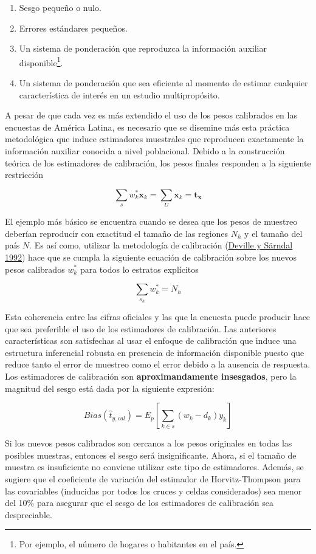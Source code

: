 \documentclass[
  12pt,
  spanish,
]{book}
\providecommand{\tightlist}{%
  \setlength{\itemsep}{0pt}\setlength{\parskip}{0pt}}
\begin{document}
\begin{enumerate}
\def\labelenumi{\arabic{enumi}.}
\tightlist
\item
  Sesgo pequeño o nulo.
\item
  Errores estándares pequeños.
\item
  Un sistema de ponderación que reproduzca la información auxiliar disponible\footnote{Por ejemplo, el número de hogares o habitantes en el país.}.
\item
  Un sistema de ponderación que sea eficiente al momento de estimar cualquier característica de interés en un estudio multipropósito.
\end{enumerate}

A pesar de que cada vez es más extendido el uso de los pesos calibrados en las encuestas de América Latina, es necesario que se disemine más esta práctica metodológica que induce estimadores muestrales que reproducen exactamente la información auxiliar conocida a nivel poblacional. Debido a la construcción teórica de los estimadores de calibración, los pesos finales responden a la siguiente restricción

\[
\sum_{s}w^*_{k}\boldsymbol{x}_k = \sum_{U}\boldsymbol{x}_{k} = \boldsymbol{t}_{\boldsymbol{x}}
\]

El ejemplo más básico se encuentra cuando se desea que los pesos de muestreo deberían reproducir con exactitud el tamaño de las regiones \(N_h\) y el tamaño del país \(N\). Es así como, utilizar la metodología de calibración (\protect\hyperlink{ref-Deville_Sarndal_1992}{Deville y Särndal 1992}) hace que se cumpla la siguiente ecuación de calibración sobre los nuevos pesos calibrados \(w_k^*\) para todos lo estratos explícitos

\[
\sum_{s_h} w_k^* = N_h
\]

Esta coherencia entre las cifras oficiales y las que la encuesta puede producir hace que sea preferible el uso de los estimadores de calibración. Las anteriores características son satisfechas al usar el enfoque de calibración que induce una estructura inferencial robusta en presencia de información disponible puesto que reduce tanto el error de muestreo como el error debido a la ausencia de respuesta. Los estimadores de calibración son \textbf{aproximandamente insesgados}, pero la magnitud del sesgo está dada por la siguiente expresión:

\[
Bias(\hat{t}_{y, cal}) = E_p \left[ \sum_{k \in s} (w_k - d_k) y_k \right]
\]

Si los nuevos pesos calibrados son cercanos a los pesos originales en todas las posibles muestras, entonces el sesgo será insignificante. Ahora, si el tamaño de muestra es insuficiente no conviene utilizar este tipo de estimadores. Además, se sugiere que el coeficiente de variación del estimador de Horvitz-Thompson para las covariables (inducidas por todos los cruces y celdas considerados) sea menor del 10\% para asegurar que el sesgo de los estimadores de calibración sea despreciable.
\end{document}

